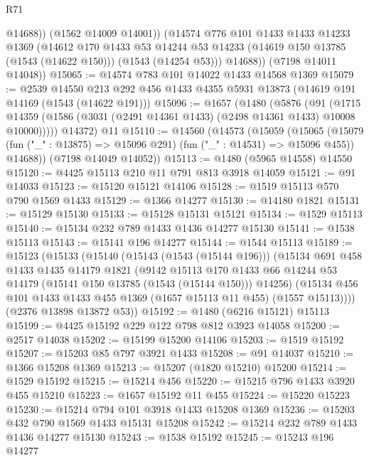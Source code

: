 \begin{lexlean}{R71}
\begin{coremodule}
              @14688))
          (@1562 @14009 @14001))
        (@14574
          @776
          @101
          @1433
          @1433
          @14233
          @1369
          (@14612
            @170
            @1433
            @53
            @14244
            @53
            @14233
            (@14619 @150 @13785 (@1543 (@14622 @150)))
            (@1543 (@14254 @53)))
          @14688))
      (@7198 @14011 @14048))
@15065 := @14574 @783 @101 @14022 @1433 @14568 @1369
@15079 := @2539
    @14550
    @213
    @292
    @456
    @1433
    @4355
    @5931
    @13873
    (@14619 @191 @14169 (@1543 (@14622 @191)))
@15096 := @1657
    (@1480
      (@5876
        (@91
          (@1715 @14359 (@1586 (@3031 (@2491 @14361 @1433) (@2498 @14361 @1433) @10008 @10000)))))
      @14372)
    @11
@15110 := @14560
    (@14573
      (@15059
        (@15065
          (@15079 (fun ("_" : @13875) => @15096 @291) (fun ("_" : @14531) => @15096 @455))
          @14688))
      (@7198 @14049 @14052))
@15113 := @1480 (@5965 @14558) @14550
@15120 := @4425 @15113 @210 @11 @791 @813 @3918 @14059
@15121 := @91 @14033
@15123 := @15120 @15121 @14106
@15128 := @1519 @15113 @570 @790 @1569 @1433
@15129 := @1366 @14277
@15130 := @14180 @1821
@15131 := @15129 @15130
@15133 := @15128 @15131 @15121
@15134 := @1529 @15113
@15140 := @15134 @232 @789 @1433 @1436 @14277 @15130
@15141 := @1538 @15113
@15143 := @15141 @196 @14277
@15144 := @1544 @15113
@15189 := @15123
    (@15133
      (@15140
        (@15143 (@1543 (@15144 @196)))
        (@15134
          @691
          @458
          @1433
          @1435
          @14179
          @1821
          (@9142
            @15113
            @170
            @1433
            @66
            @14244
            @53
            @14179
            (@15141 @150 @13785 (@1543 (@15144 @150)))
            @14256)
          (@15134 @456 @101 @1433 @1433 @455 @1369 (@1657 @15113 @11 @455) (@1557 @15113))))
      (@2376 @13898 @13872 @53))
@15192 := @1480 (@6216 @15121) @15113
@15199 := @4425 @15192 @229 @122 @798 @812 @3923 @14058
@15200 := @2517 @14038
@15202 := @15199 @15200 @14106
@15203 := @1519 @15192
@15207 := @15203 @85 @797 @3921 @1433
@15208 := @91 @14037
@15210 := @1366 @15208 @1369
@15213 := @15207 (@1820 @15210) @15200
@15214 := @1529 @15192
@15215 := @15214 @456
@15220 := @15215 @796 @1433 @3920 @455 @15210
@15223 := @1657 @15192 @11 @455
@15224 := @15220 @15223
@15230 := @15214 @794 @101 @3918 @1433 @15208 @1369
@15236 := @15203 @432 @790 @1569 @1433 @15131 @15208
@15242 := @15214 @232 @789 @1433 @1436 @14277 @15130
@15243 := @1538 @15192
@15245 := @15243 @196 @14277

\end{coremodule}
\end{lexlean}
